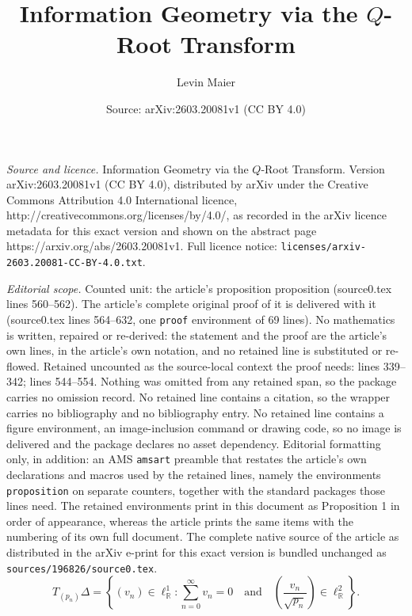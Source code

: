 \documentclass[10pt,a4paper]{amsart}
\title{Information Geometry via the $Q$-Root Transform}
\author{Levin Maier}
\date{Source: arXiv:2603.20081v1 (CC BY 4.0)}
\begin{document}
\maketitle

\noindent\emph{Source and licence.} Information Geometry via the $Q$-Root Transform. Version arXiv:2603.20081v1 (CC BY 4.0), distributed by arXiv under the Creative Commons Attribution 4.0 International licence, http://creativecommons.org/licenses/by/4.0/, as recorded in the arXiv licence metadata for this exact version and shown on the abstract page https://arxiv.org/abs/2603.20081v1. Full licence notice: \texttt{licenses/arxiv-2603.20081-CC-BY-4.0.txt}.\par\smallskip

\noindent\textit{Editorial scope.} Counted unit: the article's proposition proposition (source0.tex lines 560--562). The article's complete original proof of it is delivered with it (source0.tex lines 564--632, one \texttt{proof} environment of 69 lines). No mathematics is written, repaired or re-derived: the statement and the proof are the article's own lines, in the article's own notation, and no retained line is substituted or re-flowed.  Retained uncounted as the source-local context the proof needs: lines 339--342; lines 544--554.  Nothing was omitted from any retained span, so the package carries no omission record.  No retained line contains a citation, so the wrapper carries no bibliography and no bibliography entry.  No retained line contains a figure environment, an image-inclusion command or drawing code, so no image is delivered and the package declares no asset dependency.  Editorial formatting only, in addition: an AMS \texttt{amsart} preamble that restates the article's own declarations and macros used by the retained lines, namely the environments \texttt{proposition} on separate counters, together with the standard packages those lines need.  The retained environments print in this document as Proposition 1 in order of appearance, whereas the article prints the same items with the numbering of its own full document.  The complete native source of the article as distributed in the arXiv e-print for this exact version is bundled unchanged as \texttt{sources/196826/source0.tex}.
\begin{equation}
\label{d:differentiable_structure}
    T_{(p_n)}\Delta = \left\{ (v_n) \in \ell^1_{\mathbb{R}} : \sum_{n=0}^{\infty} v_n = 0 \quad \text{and} \quad \left(\frac{v_n}{\sqrt{p_n}}\right) \in \ell^2_{\mathbb{R}} \right\}.
\end{equation}
\end{document}
